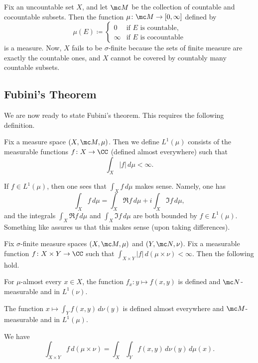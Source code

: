 \documentclass[../notes.tex]{subfiles}
\begin{document}
\begin{example}
	Fix an uncountable set $X$, and let $\mc M$ be the collection of countable and cocountable subsets. Then the function $\mu\colon\mc M\to[0,\infty]$ defined by
	\[\mu(E)\coloneqq\begin{cases}
		0 & \text{if }E\text{ is countable}, \\
		\infty & \text{if }E\text{ is cocountable}
	\end{cases}\]
	is a measure. Now, $X$ fails to be $\sigma$-finite because the sets of finite measure are exactly the countable ones, and $X$ cannot be covered by countably many countable subsets.
\end{example}

\subsection{Fubini's Theorem}
We are now ready to state Fubini's theorem. This requires the following definition.
\begin{definition}
	Fix a measure space $(X,\mc M,\mu)$. Then we define $L^1(\mu)$ consists of the measurable functions $f\colon X\to\CC$ (defined almost everywhere) such that
	\[\int_X\left|f\right|\,d\mu<\infty.\]
\end{definition}
\begin{remark}
	If $f\in L^1(\mu)$, then one sees that $\int_Xf\,d\mu$ makes sense. Namely, one has
	\[\int_Xf\,d\mu=\int_X\Re f\,d\mu+i\int_X\Im f\,d\mu,\]
	and the integrals $\int_X\Re f\,d\mu$ and $\int_X\Im f\,d\mu$ are both bounded by $f\in L^1(\mu)$. Something like \cite[Proposition~9.22]{elber-top} assures us that this makes sense (upon taking differences).
\end{remark}
\begin{theorem}[Fubini] \label{thm:fubini}
	Fix $\sigma$-finite measure spaces $(X,\mc M,\mu)$ and $(Y,\mc N,\nu)$. Fix a measurable function $f\colon X\times Y\to\CC$ such that $\int_{X\times Y}\left|f\right|\,d(\mu\times\nu)<\infty$. Then the following hold.
	\begin{listalph}
		\item For $\mu$-almost every $x\in X$, the function $f_x\colon y\mapsto f(x,y)$ is defined and $\mc N$-measurable and in $L^1(\nu)$.
		\item The function $x\mapsto\int_Yf(x,y)\,d\nu(y)$ is defined almost everywhere and $\mc M$-measurable and in $L^1(\mu)$.
		\item We have
		\[\int_{X\times Y}f\,d(\mu\times\nu)=\int_X\int_Yf(x,y)\,d\nu(y)\,d\mu(x).\]
	\end{listalph}
\end{theorem}
\end{document}
